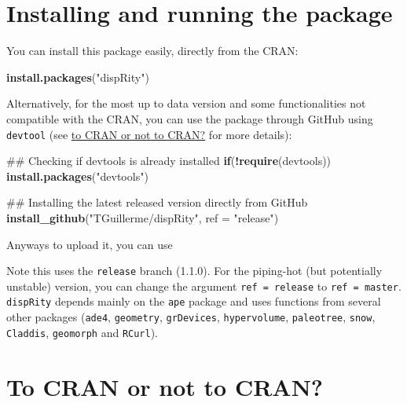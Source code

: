 \documentclass[]{book}
\newenvironment{Shaded}{\begin{snugshade}}{\end{snugshade}}
\newcommand{\KeywordTok}[1]{\textcolor[rgb]{0.13,0.29,0.53}{\textbf{#1}}}
\newcommand{\DataTypeTok}[1]{\textcolor[rgb]{0.13,0.29,0.53}{#1}}
\newcommand{\StringTok}[1]{\textcolor[rgb]{0.31,0.60,0.02}{#1}}
\newcommand{\ControlFlowTok}[1]{\textcolor[rgb]{0.13,0.29,0.53}{\textbf{#1}}}
\newcommand{\OperatorTok}[1]{\textcolor[rgb]{0.81,0.36,0.00}{\textbf{#1}}}
\newcommand{\NormalTok}[1]{#1}
\theoremstyle{definition}
\theoremstyle{definition}
\theoremstyle{remark}
\begin{document}
\section{Installing and running the
package}\label{installing-and-running-the-package}

You can install this package easily, directly from the CRAN:

\begin{Shaded}
\begin{Highlighting}[]
\KeywordTok{install.packages}\NormalTok{(}\StringTok{"dispRity"}\NormalTok{)}
\end{Highlighting}
\end{Shaded}

Alternatively, for the most up to data version and some functionalities
not compatible with the CRAN, you can use the package through GitHub
using \texttt{devtool} (see \protect\hyperlink{noCRAN}{to CRAN or not to
CRAN?} for more details):

\begin{Shaded}
\begin{Highlighting}[]
\NormalTok{## Checking if devtools is already installed}
\ControlFlowTok{if}\NormalTok{(}\OperatorTok{!}\KeywordTok{require}\NormalTok{(devtools)) }\KeywordTok{install.packages}\NormalTok{(}\StringTok{"devtools"}\NormalTok{)}

\NormalTok{## Installing the latest released version directly from GitHub}
\KeywordTok{install_github}\NormalTok{(}\StringTok{"TGuillerme/dispRity"}\NormalTok{, }\DataTypeTok{ref =} \StringTok{"release"}\NormalTok{)}
\end{Highlighting}
\end{Shaded}

Anyways to upload it, you can use

Note this uses the \texttt{release} branch (1.1.0). For the piping-hot
(but potentially unstable) version, you can change the argument
\texttt{ref\ =\ release} to \texttt{ref\ =\ master}. \texttt{dispRity}
depends mainly on the \texttt{ape} package and uses functions from
several other packages (\texttt{ade4}, \texttt{geometry},
\texttt{grDevices}, \texttt{hypervolume}, \texttt{paleotree},
\texttt{snow}, \texttt{Claddis}, \texttt{geomorph} and \texttt{RCurl}).

\hypertarget{noCRAN}{\section{To CRAN or not to CRAN?}\label{noCRAN}}
\end{document}

